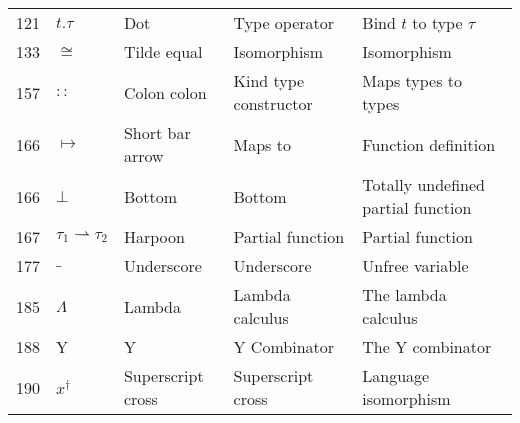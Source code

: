 \documentclass[12pt]{article}
\begin{document}
\begin{tabular}[b] {p{} p{} p{} p{} p{}}
121 & $t.\tau$ & Dot & Type operator & Bind $t$ to type $\tau$ \\
133 & $ \cong $ & Tilde equal & Isomorphism & Isomorphism \\
157 & $::$ & Colon colon & Kind type constructor & Maps types to types \\
166 & $\mapsto$ & Short bar arrow & Maps to & Function definition \\
166 &$ \bot$ & Bottom & Bottom & Totally undefined partial function \\
167 & $\tau_1 \rightharpoonup \tau_2$ & Harpoon & Partial function & Partial function \\
177 & $\_$ & Underscore & Underscore & Unfree variable \\
185 & $\Lambda$ & Lambda & Lambda calculus & The lambda calculus \\
188 & Y & Y & Y Combinator & The Y combinator \\
190 & $x^{\dagger}$ & Superscript cross & Superscript cross & Language isomorphism \\

\end{tabular}
\end{document}

